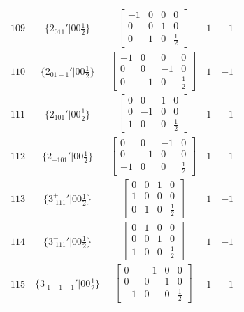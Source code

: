 \documentclass[fleqn,8pt]{jsarticle}
\begin{document}
\begin{longtable}{ccccc}
$ 109 $ & $ \{2{}_{011}{}'|0 0 \frac{1}{2}\} $ & $ \begin{bmatrix} -1 & 0 & 0 & 0 \\ 0 & 0 & 1 & 0 \\ 0 & 1 & 0 & \frac{1}{2} \end{bmatrix} $ & $ 1 $ & $ -1 $ \\ \hline
$ 110 $ & $ \{2{}_{01-1}{}'|0 0 \frac{1}{2}\} $ & $ \begin{bmatrix} -1 & 0 & 0 & 0 \\ 0 & 0 & -1 & 0 \\ 0 & -1 & 0 & \frac{1}{2} \end{bmatrix} $ & $ 1 $ & $ -1 $ \\ \hline
$ 111 $ & $ \{2{}_{101}{}'|0 0 \frac{1}{2}\} $ & $ \begin{bmatrix} 0 & 0 & 1 & 0 \\ 0 & -1 & 0 & 0 \\ 1 & 0 & 0 & \frac{1}{2} \end{bmatrix} $ & $ 1 $ & $ -1 $ \\ \hline
$ 112 $ & $ \{2{}_{-101}{}'|0 0 \frac{1}{2}\} $ & $ \begin{bmatrix} 0 & 0 & -1 & 0 \\ 0 & -1 & 0 & 0 \\ -1 & 0 & 0 & \frac{1}{2} \end{bmatrix} $ & $ 1 $ & $ -1 $ \\ \hline
$ 113 $ & $ \{3^{+}_{\,\,111}{}'|0 0 \frac{1}{2}\} $ & $ \begin{bmatrix} 0 & 0 & 1 & 0 \\ 1 & 0 & 0 & 0 \\ 0 & 1 & 0 & \frac{1}{2} \end{bmatrix} $ & $ 1 $ & $ -1 $ \\ \hline
$ 114 $ & $ \{3^{-}_{\,\,111}{}'|0 0 \frac{1}{2}\} $ & $ \begin{bmatrix} 0 & 1 & 0 & 0 \\ 0 & 0 & 1 & 0 \\ 1 & 0 & 0 & \frac{1}{2} \end{bmatrix} $ & $ 1 $ & $ -1 $ \\ \hline
$ 115 $ & $ \{3^{-}_{\,\,1-1-1}{}'|0 0 \frac{1}{2}\} $ & $ \begin{bmatrix} 0 & -1 & 0 & 0 \\ 0 & 0 & 1 & 0 \\ -1 & 0 & 0 & \frac{1}{2} \end{bmatrix} $ & $ 1 $ & $ -1 $ \\ \hline

\end{longtable}
\end{document}

